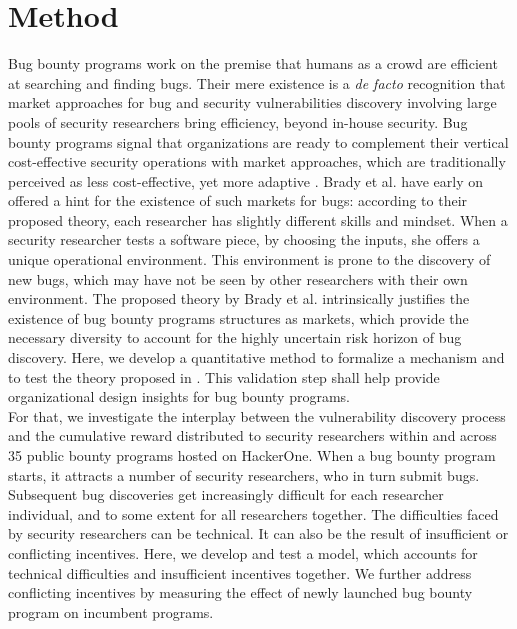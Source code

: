 \section{Method}
\label{sec:method}
Bug bounty programs work on the premise that humans as a crowd are efficient at searching and finding bugs. Their mere existence is a {\it de facto} recognition that market approaches for bug and security vulnerabilities discovery involving large pools of security researchers bring efficiency, beyond in-house security. Bug bounty programs signal that organizations are ready to complement their vertical cost-effective security operations with market approaches, which are traditionally perceived as less cost-effective, yet more adaptive \cite{coase1937}. Brady et al. \cite{brady1999murphy} have early on offered a hint for the existence of such markets for bugs: according to their proposed theory, each researcher has slightly different skills and mindset. When a security researcher tests a software piece, by choosing the inputs, she offers a unique operational environment. This environment is prone to the discovery of new bugs, which may have not be seen by other researchers with their own environment. The proposed theory by Brady et al. \cite{brady1999murphy} intrinsically justifies the existence of bug bounty programs structures as markets, which provide the necessary diversity to account for the highly uncertain risk horizon of bug discovery. Here, we develop a quantitative method to formalize a mechanism and to test the theory proposed in \cite{brady1999murphy}. This validation step shall help provide organizational design insights for bug bounty programs.\\

For that, we investigate the interplay between the vulnerability discovery process and the cumulative reward distributed to security researchers within and across 35 public bounty programs hosted on HackerOne. When a bug bounty program starts, it attracts a number of security researchers, who in turn submit bugs. Subsequent bug discoveries get increasingly difficult for each researcher individual, and to some extent for all researchers together. The difficulties faced by security researchers can be technical. It can also be the result of insufficient or conflicting incentives. Here, we develop and test a model, which accounts for technical difficulties and insufficient incentives together. We further address conflicting incentives by measuring the effect of newly launched bug bounty program on incumbent programs.\\

